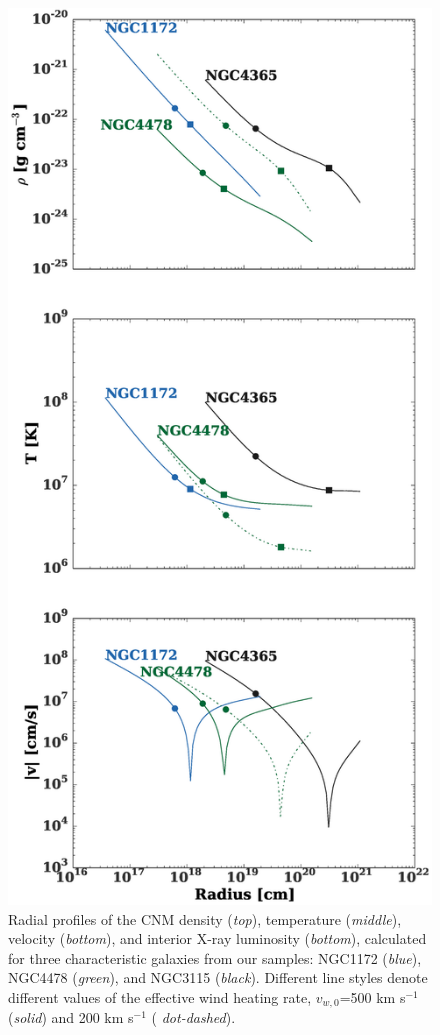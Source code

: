\documentclass[usenatbib,fleqn]{mn2e}
\begin{document}

\begin{figure}
  \includegraphics[width=\columnwidth]{profiles.eps}
  \caption{\label{fig:profiles}Radial profiles of the CNM density
    ({\it top}), temperature ({\it middle}), velocity  ({\it bottom}), and
    interior X-ray luminosity ({\it bottom}), calculated for three
    characteristic galaxies from our samples: NGC1172 ({\it blue}),
    NGC4478 ({\it green}), and NGC3115 ({\it black}).  Different line
    styles denote different values of the effective wind heating rate,
    $v_{w,0}$=500 km s$^{-1}$ ({\it solid}) and 200 km s$^{-1}$ ({\it
     dot-dashed}).}
\end{figure}
\end{document}
